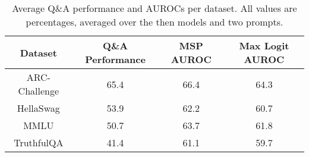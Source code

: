 \begin{table*}
\centering
\begin{tabular}{c|c|c|c}
Dataset & Q\&A Performance & MSP AUROC & Max Logit AUROC\\ \hline
ARC-Challenge & 65.4 & 66.4 & 64.3\\
HellaSwag & 53.9 & 62.2 & 60.7\\
MMLU & 50.7 & 63.7 & 61.8\\
TruthfulQA & 41.4 & 61.1 & 59.7\\
\hline
\end{tabular}
\caption{Average Q\&A performance and AUROCs per dataset. All values are percentages, averaged over the then models and two prompts.}
\label{tab:dataset}
\end{table*}
